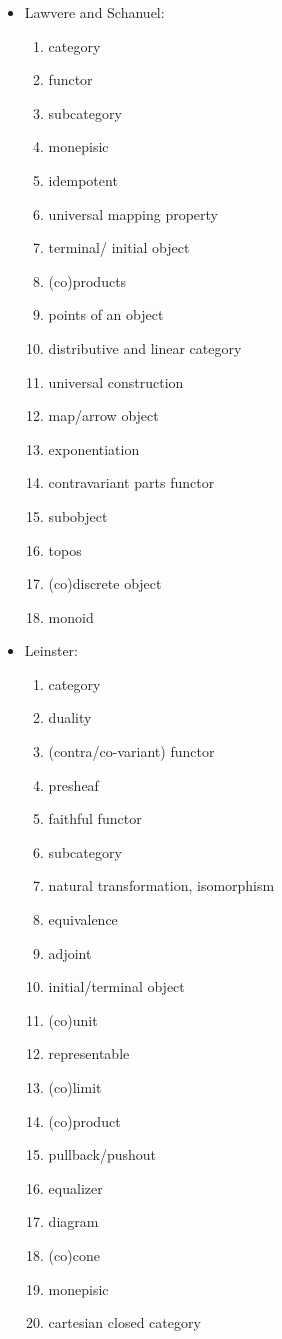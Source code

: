 \documentclass[11pt,openany]{book}
\begin{document}
\begin{itemize}
\item Lawvere and Schanuel:~\cite{LawvereSchanuel:2009:ConceptualMath}
\begin{enumerate}
  \item category
  \item functor
  \item subcategory
  \item monepisic
  \item idempotent
  \item universal mapping property
  \item terminal/ initial object
  \item (co)products
  \item points of an object
  \item distributive and linear category
  \item universal construction
  \item map/arrow object
  \item exponentiation
  \item contravariant parts functor
  \item subobject
  \item topos
  \item (co)discrete object
  \item monoid
  
\end{enumerate}

\item Leinster:~\cite{Leinster:2016:BasicCategoryTheory}
\begin{enumerate}
  \item category
  \item duality
  \item (contra/co-variant) functor
  \item presheaf
  \item faithful functor
  \item subcategory
  \item natural transformation, isomorphism
  \item equivalence
  \item adjoint
  \item initial/terminal object
  \item (co)unit
  \item representable
  \item (co)limit
  \item (co)product
  \item pullback/pushout
  \item equalizer
  \item diagram
  \item (co)cone
  \item monepisic
  \item cartesian closed category
\end{enumerate}


\end{itemize}
\end{document}
